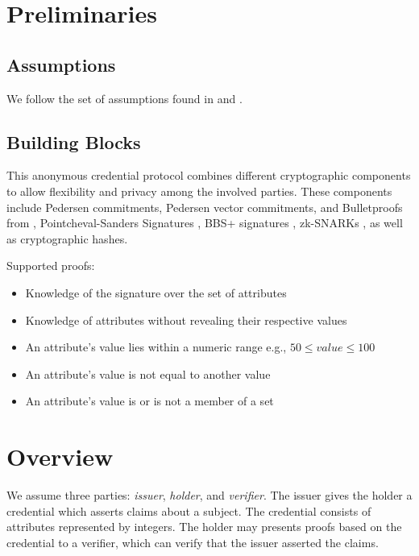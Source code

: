 \documentclass[a4paper]{article}
\begin{document}
\section{Preliminaries}
\subsection{Assumptions}
We follow the set of assumptions found in \cite{BBBPWM18} and \cite{CamenischDL16}.

\subsection{Building Blocks}
This anonymous credential protocol combines different cryptographic components to allow flexibility and privacy among the involved parties. 
These components include Pedersen commitments, Pedersen vector commitments, and Bulletproofs from \cite{BBBPWM18}, Pointcheval-Sanders Signatures \cite{manu-paper}, BBS+ signatures \cite{CamenischDL16}, zk-SNARKs \cite{ZCashSapling}, as well as cryptographic hashes. 

Supported proofs:

\begin{itemize}
    \item Knowledge of the signature over the set of attributes
    \item Knowledge of attributes without revealing their respective values
    \item An attribute's value lies within a numeric range e.g., $50 \leq value \leq 100$
    \item An attribute's value is not equal to another value
    \item An attribute's value is or is not a member of a set
\end{itemize}

\section{Overview}
We assume three parties: \emph{issuer}, \emph{holder}, and \emph{verifier}. The issuer gives the holder a credential which asserts claims about a subject. The credential consists of attributes represented by integers. The holder may presents proofs based on the credential to a verifier, which can verify that the issuer asserted the claims. 
\end{document}
